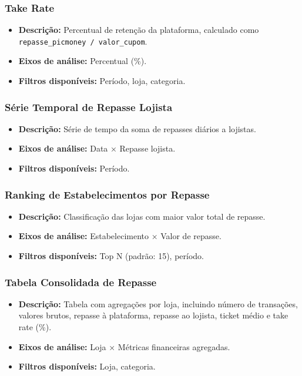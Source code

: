\documentclass[12pt]{article}
\begin{document}
\subsubsection{Take Rate}
\begin{itemize}
    \item \textbf{Descrição:} Percentual de retenção da plataforma, calculado como \texttt{repasse\_picmoney / valor\_cupom}.
    \item \textbf{Eixos de análise:} Percentual (\%).
    \item \textbf{Filtros disponíveis:} Período, loja, categoria.
\end{itemize}

\subsubsection{Série Temporal de Repasse Lojista}
\begin{itemize}
    \item \textbf{Descrição:} Série de tempo da soma de repasses diários a lojistas.
    \item \textbf{Eixos de análise:} Data × Repasse lojista.
    \item \textbf{Filtros disponíveis:} Período.
\end{itemize}

\subsubsection{Ranking de Estabelecimentos por Repasse}
\begin{itemize}
    \item \textbf{Descrição:} Classificação das lojas com maior valor total de repasse.
    \item \textbf{Eixos de análise:} Estabelecimento × Valor de repasse.
    \item \textbf{Filtros disponíveis:} Top N (padrão: 15), período.
\end{itemize}

\subsubsection{Tabela Consolidada de Repasse}
\begin{itemize}
    \item \textbf{Descrição:} Tabela com agregações por loja, incluindo número de transações, valores brutos, repasse à plataforma, repasse ao lojista, ticket médio e take rate (\%).
    \item \textbf{Eixos de análise:} Loja × Métricas financeiras agregadas.
    \item \textbf{Filtros disponíveis:} Loja, categoria.
\end{itemize}
\end{document}
